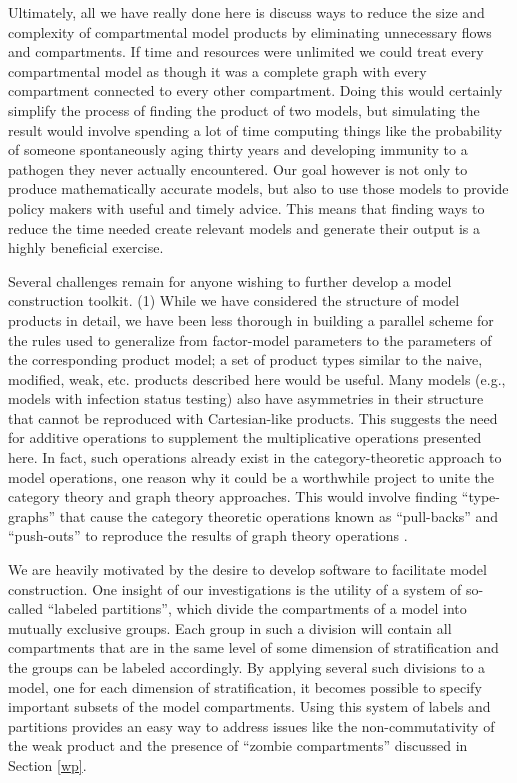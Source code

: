 Ultimately, all we have really done here is discuss ways to reduce the size and complexity of compartmental model products by eliminating unnecessary flows and compartments. If time and resources were unlimited we could treat every compartmental model as though it was a complete graph with every compartment connected to every other compartment. Doing this would certainly simplify the process of finding the product of two models, but simulating the result would involve spending a lot of time computing things like the probability of someone spontaneously aging thirty years and developing immunity to a pathogen they never actually encountered. Our goal however is not only to produce mathematically accurate models, but also to use those models to provide policy makers with useful and timely advice. This means that finding ways to reduce the time needed create relevant models and generate their output is a highly beneficial exercise.

Several challenges remain for anyone wishing to further develop a model construction toolkit. (1) While we have considered the structure of model products in detail, we have been less thorough in building a parallel scheme for the rules used to generalize from factor-model parameters to the parameters of the corresponding product model; a set of product types similar to the naive, modified, weak, etc. products described here would be useful. Many models (e.g., models with infection status testing) also have asymmetries in their structure that cannot be reproduced with Cartesian-like products. This suggests the need for additive operations to supplement the multiplicative operations presented here. In fact, such operations already exist in the category-theoretic approach to model operations, one reason why it could be a worthwhile project to unite the category theory and graph theory approaches. This would involve finding ``type-graphs'' that cause the category theoretic operations known as ``pull-backs'' and ``push-outs'' to  reproduce the results of graph theory operations \citep{fong2018seven, Libkind2022an, libkind2021operadic, baez2023categorical, baez2017compositional}.

We are heavily motivated by the desire to develop software to facilitate model construction. One insight of our investigations is the utility of a system of so-called ``labeled partitions'', which divide the compartments of a model into mutually exclusive groups. Each group in such a division will contain all compartments that are in the same level of some dimension of stratification and the groups can be labeled accordingly. By applying several such divisions to a model, one for each dimension of stratification, it becomes possible to specify important subsets of the model compartments. Using this system of labels and partitions provides an easy way to address issues like the non-commutativity of the weak product and the presence of ``zombie compartments'' discussed in Section \ref{wp}.

